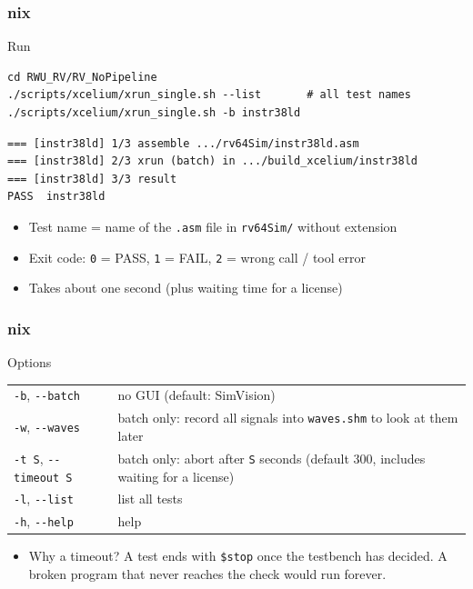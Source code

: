 \documentclass{beamer}
\newcommand{\astitle}{nix}
\newcommand{\assubtitle}{nix}
\newcommand{\cmd}[1]{\texttt{#1}}
\begin{document}
\renewcommand{\assubtitle}{Run}
\begin{frame}[fragile]
\frametitle{\astitle}
\begin{block}{\assubtitle}
\begin{lstlisting}[style=sh,basicstyle=\ttfamily\small]
cd RWU_RV/RV_NoPipeline
./scripts/xcelium/xrun_single.sh --list       # all test names
./scripts/xcelium/xrun_single.sh -b instr38ld
\end{lstlisting}
\begin{lstlisting}
=== [instr38ld] 1/3 assemble .../rv64Sim/instr38ld.asm
=== [instr38ld] 2/3 xrun (batch) in .../build_xcelium/instr38ld
=== [instr38ld] 3/3 result
PASS  instr38ld
\end{lstlisting}
  \begin{itemize}
    \item Test name = name of the \cmd{.asm} file in \cmd{rv64Sim/} without extension
    \item Exit code: \cmd{0} = PASS, \cmd{1} = FAIL, \cmd{2} = wrong call / tool error
    \item Takes about one second (plus waiting time for a license)
  \end{itemize}
\end{block}
\end{frame}

\renewcommand{\assubtitle}{Options}
\begin{frame}
\frametitle{\astitle}
\begin{block}{\assubtitle}
  \footnotesize
  \begin{tabularx}{\linewidth}{@{}lY@{}}
    \cmd{-b}, \cmd{-{}-batch}        & no GUI (default: SimVision)\\[2pt]
    \cmd{-w}, \cmd{-{}-waves}        & batch only: record all signals into
                                       \cmd{waves.shm} to look at them later\\[2pt]
    \cmd{-t S}, \cmd{-{}-timeout S}  & batch only: abort after \cmd{S} seconds
                                       (default 300, includes waiting for a license)\\[2pt]
    \cmd{-l}, \cmd{-{}-list}         & list all tests\\[2pt]
    \cmd{-h}, \cmd{-{}-help}         & help\\
  \end{tabularx}
  \vspace{6pt}
  \begin{itemize}
    \item Why a timeout? A test ends with \cmd{\$stop} once the testbench has decided.
      A broken program that never reaches the check would run forever.
  \end{itemize}
\end{block}
\end{frame}
\end{document}

